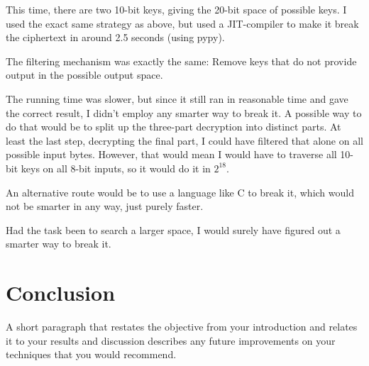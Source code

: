 \documentclass[a4paper,english,12pt]{article}
\begin{document}
This time, there are two 10-bit keys, giving the 20-bit space of possible keys.
I used the exact same strategy as above, but used a JIT-compiler to make it
break the ciphertext in around 2.5 seconds (using pypy).

The filtering mechanism was exactly the same: Remove keys that do not provide
output in the possible output space.

The running time was slower, but since it still ran in reasonable time and gave
the correct result, I didn't employ any smarter way to break it. A possible way
to do that would be to split up the three-part decryption into distinct parts.
At least the last step, decrypting the final part, I could have filtered that
alone on all possible input bytes. However, that would mean I would have to
traverse all 10-bit keys on all 8-bit inputs, so it would do it in $2^{18}$.

An alternative route would be to use a language like C to break it, which would
not be smarter in any way, just purely faster.

Had the task been to search a larger space, I would surely have figured out a
smarter way to break it.

\section{Conclusion}

A short paragraph that restates the objective from your introduction and
relates it to your results and discussion describes any future improvements on
your techniques that you would recommend.



\end{document}
